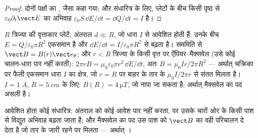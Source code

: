 \begin{proof}
दोनों पक्षों का , जैसा कहा गया; और संधारित्र के लिए, प्लेटों के बीच
किसी पृष्ठ से $\varepsilon_0\partial_t\vect E$ का अभिवाह
$\varepsilon_0S\,\dd E/\dd t = \dd Q/\dd t = I$ है।
\end{proof}

\begin{example}[आवेशित होते संधारित्र के भीतर क्षेत्र]\label{ex:b2:maxwell-equations:capacitor}
$R$ त्रिज्या की वृत्ताकार प्लेटें, अंतराल $d \ll R$, जो धारा
$I$ से आवेशित होती हैं: उनके बीच $E = Q/\varepsilon_0\pi R^2$ एकसमान है और $\dd E/
\dd t = I/\varepsilon_0\pi R^2$ से बढ़ता है। सममिति से $\vect B = B(r)\vect e_\theta$; और $r < R$
त्रिज्या के किसी वृत्त पर ऐंपियर--मैक्सवेल (उसे कोई चालन-धारा पार नहीं करती): $2\pi rB
= \mu_0\varepsilon_0\pi r^2\,\dd E/\dd t$, अतः $B = \mu_0Ir/2\pi R^2$ --- अर्थात् चक्रिका पर
फैली एकसमान धारा $I$ का क्षेत्र, जो $r = R$ पर बाहर के तार के
$\mu_0I/2\pi r$ से संतत मिलता है। $I = \qty{1}{A}$, $R = \qty{5}{cm}$ के लिए: $B(R) =
\qty{4}{\micro T}$, जो नापा जा सकता है; अर्थात् मैक्सवेल का पद असली है।
\end{example}

\begin{omfigure}

{\small आवेशित होता कोई संधारित्र: अंतराल को कोई आवेश पार नहीं करता, पर
उसके चारों ओर के किसी पाश से विद्युत अभिवाह बढ़ता जाता है; और मैक्सवेल का पद उस
पाश को $\vect B$ का वही परिचालन दे देता है जो तार के जारी रहने पर मिलता ---
अर्थात् ।}
\end{omfigure}

